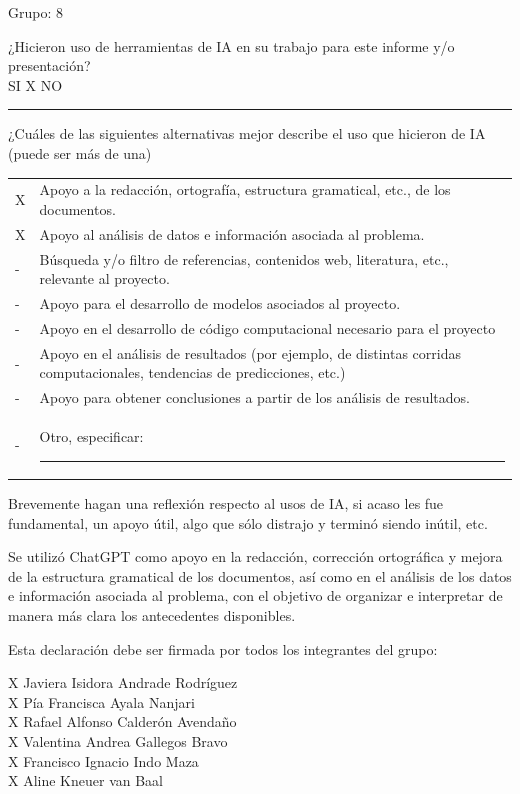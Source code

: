 \noindent Grupo: 8

\vspace{0.6cm}

\noindent ¿Hicieron uso de herramientas de IA en su trabajo para este informe y/o presentación? \\
SI  X \hspace{1cm} NO \rule{1.5cm}{0.4pt}

\vspace{0.7cm}

\noindent ¿Cuáles de las siguientes alternativas mejor describe el uso que hicieron de IA (puede ser más de una)

\vspace{0.4cm}

\noindent
\begin{tabular}{@{}p{} p{}@{}}
X & Apoyo a la redacción, ortografía, estructura gramatical, etc., de los documentos. \\
X & Apoyo al análisis de datos e información asociada al problema. \\
- & Búsqueda y/o filtro de referencias, contenidos web, literatura, etc., relevante al proyecto. \\
- & Apoyo para el desarrollo de modelos asociados al proyecto. \\
- & Apoyo en el desarrollo de código computacional necesario para el proyecto \\
- & Apoyo en el análisis de resultados (por ejemplo, de distintas corridas computacionales, tendencias de predicciones, etc.) \\
- & Apoyo para obtener conclusiones a partir de los análisis de resultados. \\
- & Otro, especificar: \rule{10cm}{0.4pt}
\end{tabular}

\vspace{0.8cm}

\noindent Brevemente hagan una reflexión respecto al usos de IA, si acaso les fue fundamental, un apoyo útil, algo que sólo distrajo y terminó siendo inútil, etc.

Se utilizó ChatGPT como apoyo en la redacción, corrección ortográfica y mejora de la estructura gramatical de los documentos, así como en el análisis de los datos e información asociada al problema, con el objetivo de organizar e interpretar de manera más clara los antecedentes disponibles.

\noindent Esta declaración debe ser firmada por todos los integrantes del grupo:

\noindent X Javiera Isidora Andrade Rodríguez\\
X Pía Francisca Ayala Nanjari\\
X Rafael Alfonso Calderón Avendaño\\
X Valentina Andrea Gallegos Bravo\\
X Francisco Ignacio Indo Maza\\
X Aline Kneuer van Baal



